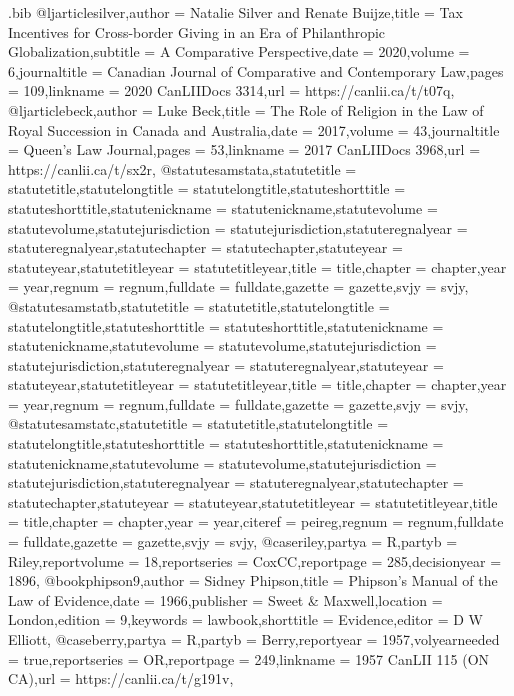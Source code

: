 \begin{filecontents*}[overwrite]{\jobname.bib}
@ljarticle{silver,author = {Natalie Silver and Renate Buijze},title = {Tax Incentives for Cross-border Giving in an Era of Philanthropic Globalization},subtitle = {A Comparative Perspective},date = {2020},volume = {6},journaltitle = {Canadian Journal of Comparative and Contemporary Law},pages = {109},linkname = {2020 CanLIIDocs 3314},url = {https://canlii.ca/t/t07q},}
@ljarticle{beck,author = {Luke Beck},title = {The Role of Religion in the Law of Royal Succession in Canada and Australia},date = {2017},volume = {43},journaltitle = {Queen's Law Journal},pages = {53},linkname = {2017 CanLIIDocs 3968},url = {https://canlii.ca/t/sx2r},}
@statute{samstata,statutetitle = {statutetitle},statutelongtitle = {statutelongtitle},statuteshorttitle = {statuteshorttitle},statutenickname = {statutenickname},statutevolume = {statutevolume},statutejurisdiction = {statutejurisdiction},statuteregnalyear = {statuteregnalyear},statutechapter = {statutechapter},statuteyear = {statuteyear},statutetitleyear = {statutetitleyear},title = {title},chapter = {chapter},year = {year},regnum = {regnum},fulldate = {fulldate},gazette = {gazette},svjy = {svjy},}
@statute{samstatb,statutetitle = {statutetitle},statutelongtitle = {statutelongtitle},statuteshorttitle = {statuteshorttitle},statutenickname = {statutenickname},statutevolume = {statutevolume},statutejurisdiction = {statutejurisdiction},statuteregnalyear = {statuteregnalyear},statuteyear = {statuteyear},statutetitleyear = {statutetitleyear},title = {title},chapter = {chapter},year = {year},regnum = {regnum},fulldate = {fulldate},gazette = {gazette},svjy = {svjy},}
@statute{samstatc,statutetitle = {statutetitle},statutelongtitle = {statutelongtitle},statuteshorttitle = {statuteshorttitle},statutenickname = {statutenickname},statutevolume = {statutevolume},statutejurisdiction = {statutejurisdiction},statuteregnalyear = {statuteregnalyear},statutechapter = {statutechapter},statuteyear = {statuteyear},statutetitleyear = {statutetitleyear},title = {title},chapter = {chapter},year = {year},citeref = {peireg},regnum = {regnum},fulldate = {fulldate},gazette = {gazette},svjy = {svjy},}
@case{riley,partya = {R},partyb = {Riley},reportvolume = {18},reportseries = {CoxCC},reportpage = {285},decisionyear = {1896},}
@book{phipson9,author = {Sidney Phipson},title = {Phipson’s Manual of the Law of Evidence},date = {1966},publisher = {Sweet \& Maxwell},location = {London},edition = {9},keywords = {lawbook},shorttitle = {Evidence},editor = {D W Elliott},}
@case{berry,partya = {R},partyb = {Berry},reportyear = {1957},volyearneeded = {true},reportseries = {OR},reportpage = {249},linkname = {1957 CanLII 115 (ON CA)},url = {https://canlii.ca/t/g191v},}

\end{filecontents*}
